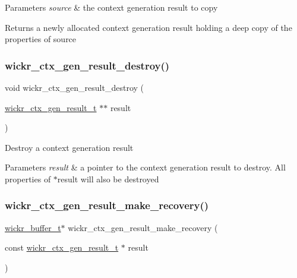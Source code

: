 \begin{DoxyParams}{Parameters}
{\em source} & the context generation result to copy \\
\hline
\end{DoxyParams}
\begin{DoxyReturn}{Returns}
a newly allocated context generation result holding a deep copy of the properties of \textquotesingle{}source\textquotesingle{} 
\end{DoxyReturn}
\mbox{\label{group__wickr__ctx_ga865854408d22e4697eebe5bc129cc6b1}} 
\subsubsection{\texorpdfstring{wickr\+\_\+ctx\+\_\+gen\+\_\+result\+\_\+destroy()}{wickr\_ctx\_gen\_result\_destroy()}}
{\footnotesize\ttfamily void wickr\+\_\+ctx\+\_\+gen\+\_\+result\+\_\+destroy (\begin{DoxyParamCaption}\item[{\mbox{\hyperlink{structwickr__ctx__gen__result}{wickr\+\_\+ctx\+\_\+gen\+\_\+result\+\_\+t}} $\ast$$\ast$}]{result }\end{DoxyParamCaption})}

Destroy a context generation result


\begin{DoxyParams}{Parameters}
{\em result} & a pointer to the context generation result to destroy. All properties of \textquotesingle{}$\ast$result\textquotesingle{} will also be destroyed \\
\hline
\end{DoxyParams}
\mbox{\label{group__wickr__ctx_gaa32727731391f1e3fbde26094924b533}} 
\subsubsection{\texorpdfstring{wickr\+\_\+ctx\+\_\+gen\+\_\+result\+\_\+make\+\_\+recovery()}{wickr\_ctx\_gen\_result\_make\_recovery()}}
{\footnotesize\ttfamily \mbox{\hyperlink{structwickr__buffer}{wickr\+\_\+buffer\+\_\+t}}$\ast$ wickr\+\_\+ctx\+\_\+gen\+\_\+result\+\_\+make\+\_\+recovery (\begin{DoxyParamCaption}\item[{const \mbox{\hyperlink{structwickr__ctx__gen__result}{wickr\+\_\+ctx\+\_\+gen\+\_\+result\+\_\+t}} $\ast$}]{result }\end{DoxyParamCaption})}

